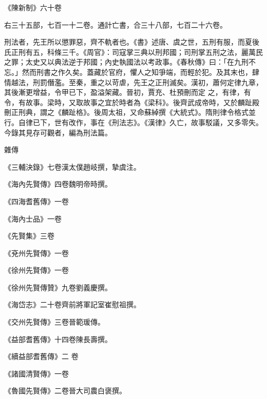 \begin{pinyinscope}
 《陳新制》六十卷



 右三十五部，七百一十二卷。通計亡書，合三十八部，七百二十六卷。



 刑法者，先王所以懲罪惡，齊不軌者也。《書》述唐、虞之世，五刑有服，而夏後氏正刑有五，科條三千。《周官》：司寇掌三典以刑邦國；司刑掌五刑之法，麗萬民之罪；太史又以典法逆于邦國；內史執國法以考政事。《春秋傳》曰：「在九刑不忘。」然而刑書之作久矣。蓋藏於官府，懼人之知爭端，而輕於犯。及其末也，肆情越法，刑罰僭濫。至秦，重之以苛虐，先王之正刑滅矣。漢初，蕭何定律九章，其後漸更增益，令甲已下，盈溢架藏。晉初，賈充、杜預刪而定
 之，有律，有令，有故事。梁時，又取故事之宜於時者為《梁科》。後齊武成帝時，又於麟趾殿刪正刑典，謂之《麟趾格》。後周太祖，又命蘇綽撰《大統式》。隋則律令格式並行。自律已下，世有改作，事在《刑法志》。《漢律》久亡，故事駁議，又多零失。今錄其見存可觀者，編為刑法篇。



 雜傳



 《三輔決錄》七卷漢太僕趙岐撰，摯虞注。



 《海內先賢傳》四卷魏明帝時撰。



 《四海耆舊傳》一卷



 《海內士品》一卷



 《先賢集》三卷



 《兗州先賢傳》一卷



 《徐州先賢傳》一卷



 《徐州先賢傳贊》九卷劉義慶撰。



 《海岱志》二十卷齊前將軍記室崔慰祖撰。



 《交州先賢傳》三卷晉範瑗傳。



 《益部耆舊傳》十四卷陳長壽撰。



 《續益部耆舊傳》二
 卷



 《諸國清賢傳》一卷



 《魯國先賢傳》二卷晉大司農白褒撰。




\end{pinyinscope}

